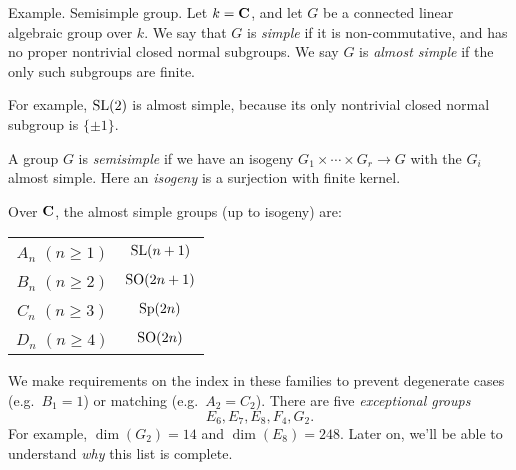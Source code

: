 Example. Semisimple group. Let $k=\mathbf{C}$, and let $G$ be a connected linear 
algebraic group over $k$. We say that $G$ is \emph{simple} if it is 
non-commutative, and has no proper nontrivial closed normal subgroups. We say 
$G$ is \emph{almost simple} if the only such subgroups are finite. 

For example, $\operatorname{SL}(2)$ is almost simple, because its only nontrivial 
closed normal subgroup is $\{\pm 1\}$. 

A group $G$ is \emph{semisimple} if we have an isogeny 
$G_1\times \cdots \times G_r\to G$ with the $G_i$ almost simple. Here an 
\emph{isogeny} is a surjection with finite kernel. 

Over $\mathbf{C}$, the almost simple groups (up to isogeny) are: 
\begin{center}
\begin{tabular}{c|c}
$A_n$ $(n\geqslant 1)$ & $\operatorname{SL}(n+1)$ \\
$B_n$ $(n\geqslant 2)$ & $\operatorname{SO}(2n+1)$ \\
$C_n$ $(n\geqslant 3)$ & $\operatorname{Sp}(2n)$ \\
$D_n$ $(n\geqslant 4)$ & $\operatorname{SO}(2n)$
\end{tabular}
\end{center}
We make requirements on the index in these families to prevent degenerate 
cases (e.g.~$B_1=1$) or matching (e.g.~$A_2=C_2$). There are five 
\emph{exceptional groups} 
\[
  E_6,E_7,E_8,F_4,G_2 .
\]
For example, $\dim(G_2)=14$ and $\dim(E_8)=248$. Later on, we'll be able to 
understand \emph{why} this list is complete. 
